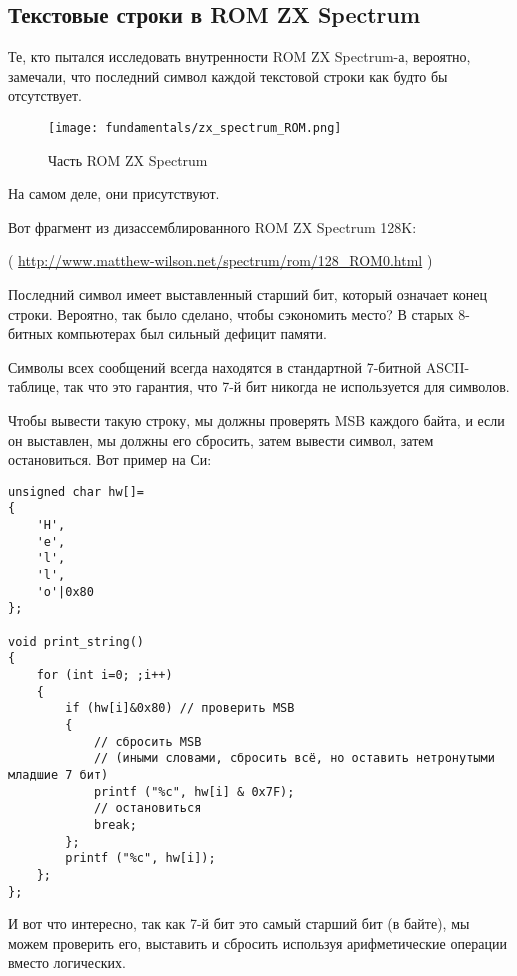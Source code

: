 \label{AND_OR_as_SUB_ADD}

\subsection{Текстовые строки в \ac{ROM} ZX Spectrum}

Те, кто пытался исследовать внутренности \ac{ROM} ZX Spectrum-а, вероятно, замечали,
что последний символ каждой текстовой строки как будто бы отсутствует.

\begin{figure}[H]
\centering
\texttt{[image: fundamentals/zx\_spectrum\_ROM.png]}
\caption{Часть \ac{ROM} ZX Spectrum}
\end{figure}

На самом деле, они присутствуют.

Вот фрагмент из дизассемблированного \ac{ROM} ZX Spectrum 128K:


( \url{http://www.matthew-wilson.net/spectrum/rom/128_ROM0.html} )

Последний символ имеет выставленный старший бит, который означает конец строки.
Вероятно, так было сделано, чтобы сэкономить место?
В старых 8-битных компьютерах был сильный дефицит памяти.

Символы всех сообщений всегда находятся в стандартной 7-битной \ac{ASCII}-таблице, так что это гарантия,
что 7-й бит никогда не используется для символов.

Чтобы вывести такую строку, мы должны проверять \ac{MSB} каждого байта, и если он выставлен, мы должны его сбросить,
затем вывести символ, затем остановиться.
Вот пример на Си:

\begin{lstlisting}[style=customc]
unsigned char hw[]=
{
	'H',
	'e',
	'l',
	'l',
	'o'|0x80
};

void print_string()
{
	for (int i=0; ;i++)
	{
		if (hw[i]&0x80) // проверить MSB
		{
			// сбросить MSB
			// (иными словами, сбросить всё, но оставить нетронутыми младшие 7 бит)
			printf ("%c", hw[i] & 0x7F);
			// остановиться
			break;
		};
		printf ("%c", hw[i]);
	};
};
\end{lstlisting}

И вот что интересно, так как 7-й бит это самый старший бит (в байте), мы можем проверить его, выставить и сбросить
используя арифметические операции вместо логических.

